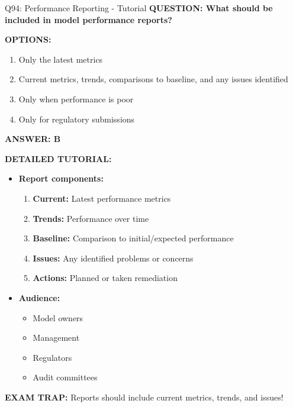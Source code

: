 \documentclass[8pt]{beamer}
\begin{document}
\begin{frame}{Q94: Performance Reporting - Tutorial}
	\fontsize{6.5}{7.5}\selectfont
	\textbf{QUESTION: What should be included in model performance reports?}
	
	\vspace{0.1cm}
	\textbf{OPTIONS:}
	\begin{enumerate}
		\item Only the latest metrics
		\item Current metrics, trends, comparisons to baseline, and any issues identified
		\item Only when performance is poor
		\item Only for regulatory submissions
	\end{enumerate}
	
	\vspace{0.1cm}
	\textcolor{myblue}{\textbf{ANSWER: B}}
	
	\vspace{0.1cm}
	\textbf{DETAILED TUTORIAL:}
	\begin{itemize}
		\item \textbf{Report components:}
		\begin{enumerate}
			\item \textbf{Current:} Latest performance metrics
			\item \textbf{Trends:} Performance over time
			\item \textbf{Baseline:} Comparison to initial/expected performance
			\item \textbf{Issues:} Any identified problems or concerns
			\item \textbf{Actions:} Planned or taken remediation
		\end{enumerate}
		\item \textbf{Audience:}
		\begin{itemize}
			\item Model owners
			\item Management
			\item Regulators
			\item Audit committees
		\end{itemize}
	\end{itemize}
	
	\textcolor{myred}{\textbf{EXAM TRAP:}} Reports should include \textcolor{myblue}{current metrics, trends, and issues}!
\end{frame}
\end{document}

